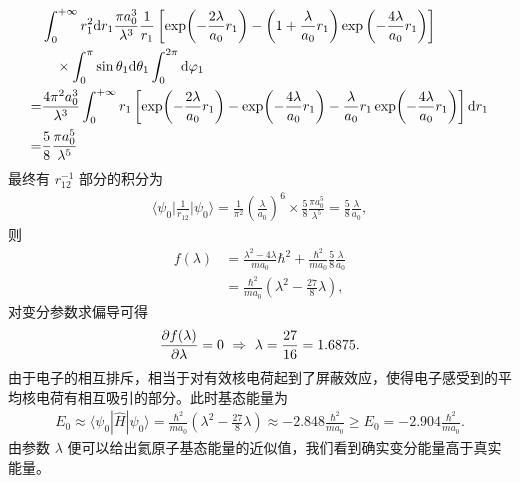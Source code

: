 \begin{align}
    &\int_0^{+\infty} r_1^2 \mathrm{d} r_1 \frac{\pi a_0^3}{\lambda^3} \frac1{r_1}  
    \left[
        \exp\!\left(-\frac{2\lambda}{a_0}r_1\right) - \left(1+\frac{\lambda}{a_0}r_1\right) \exp\left(-\frac{4\lambda}{a_0}r_1\right)
    \right] \notag \\
    &\quad \times \int_0^\pi \sin\theta_1 \mathrm{d}\theta_1
    \int_0^{2\pi} \mathrm{d}\varphi_1 \\
    =& \frac{4\pi^2 a_0^3}{\lambda^3} \int_0^{+\infty} r_1 
    \left[
        \exp\!\left(-\frac{2\lambda}{a_0} r_1\right) - \exp\!\left(-\frac{4\lambda}{a_0}r_1\right) - 
        \frac{\lambda}{a_0} r_1 \exp\!\left(-\frac{4\lambda}{a_0} r_1\right)
    \right] \mathrm{d} r_1 \notag
    \\
    =& \frac58 \frac{\pi a_0^5}{\lambda^5}
\end{align}
最终有 $r_{12}^{-1}$ 部分的积分为
\begin{align}
    \bigg\langle \psi_0 \bigg| \frac1{r_{12}} \bigg| \psi_0 \bigg\rangle = \frac1{\pi^2}\left(\frac{\lambda}{a_0}\right)^6 \times \frac58 \frac{\pi a_0^5}{\lambda^5} = \frac58 \frac{\lambda}{a_0},
\end{align}
则
\begin{align}
    f(\lambda) &= \frac{\lambda^2 - 4\lambda}{ma_0}\hbar^2 + \frac{\hbar^2}{ma_0} \frac58 \frac{\lambda}{a_0} \\
    &= \frac{\hbar^2}{ma_0} \left(\lambda^2 - \frac{27}8 \lambda\right), 
\end{align}
对变分参数求偏导可得
\begin{align}
    \pdv{f(\lambda)}{\lambda} = 0 \ \Rightarrow \ \lambda = \frac{27}{16} = \num{1.6875}.
\end{align}
由于电子的相互排斥，相当于对有效核电荷起到了屏蔽效应，使得电子感受到的平均核电荷有相互吸引的部分。此时基态能量为
\begin{align}
    E_0 \approx \langle \psi_0|\hat H | \psi_0\rangle = \frac{\hbar^2}{ma_0} \left(\lambda^2 - \frac{27}8 \lambda\right) \approx \num{-2.848} \frac{\hbar^2}{ma_0} \geqslant E_0 = \num{-2.904} \frac{\hbar^2}{ma_0}. 
\end{align}
由参数 $\lambda$ 便可以给出氦原子基态能量的近似值，我们看到确实变分能量高于真实能量。


